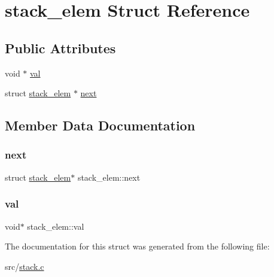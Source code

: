 \hypertarget{structstack__elem}{}\section{stack\+\_\+elem Struct Reference}
\label{structstack__elem}
\subsection*{Public Attributes}
\begin{DoxyCompactItemize}
\item 
void $\ast$ \mbox{\hyperlink{structstack__elem_a5c37181c81fa98d07ff365cdab09d8fc}{val}}
\item 
struct \mbox{\hyperlink{structstack__elem}{stack\+\_\+elem}} $\ast$ \mbox{\hyperlink{structstack__elem_a0b69757c46a31aba40df13ee60c64dad}{next}}
\end{DoxyCompactItemize}


\subsection{Member Data Documentation}
\mbox{\label{structstack__elem_a0b69757c46a31aba40df13ee60c64dad}} 
\subsubsection{\texorpdfstring{next}{next}}
{\footnotesize\ttfamily struct \mbox{\hyperlink{structstack__elem}{stack\+\_\+elem}}$\ast$ stack\+\_\+elem\+::next}

\mbox{\label{structstack__elem_a5c37181c81fa98d07ff365cdab09d8fc}} 
\subsubsection{\texorpdfstring{val}{val}}
{\footnotesize\ttfamily void$\ast$ stack\+\_\+elem\+::val}



The documentation for this struct was generated from the following file\+:\begin{DoxyCompactItemize}
\item 
src/\mbox{\hyperlink{stack_8c}{stack.\+c}}\end{DoxyCompactItemize}
